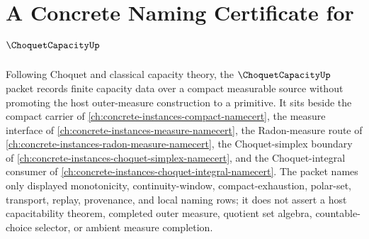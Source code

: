 \chapter{A Concrete Naming Certificate for $\ChoquetCapacityUp$}
\label{ch:concrete-instances-choquet-capacity-namecert}

Following Choquet and classical capacity theory, the $\ChoquetCapacityUp$ packet records finite capacity data over a compact measurable source without promoting the host outer-measure construction to a primitive. It sits beside the compact carrier of \autoref{ch:concrete-instances-compact-namecert}, the measure interface of \autoref{ch:concrete-instances-measure-namecert}, the Radon-measure route of \autoref{ch:concrete-instances-radon-measure-namecert}, the Choquet-simplex boundary of \autoref{ch:concrete-instances-choquet-simplex-namecert}, and the Choquet-integral consumer of \autoref{ch:concrete-instances-choquet-integral-namecert}. The packet names only displayed monotonicity, continuity-window, compact-exhaustion, polar-set, transport, replay, provenance, and local naming rows; it does not assert a host capacitability theorem, completed outer measure, quotient set algebra, countable-choice selector, or ambient measure completion.

